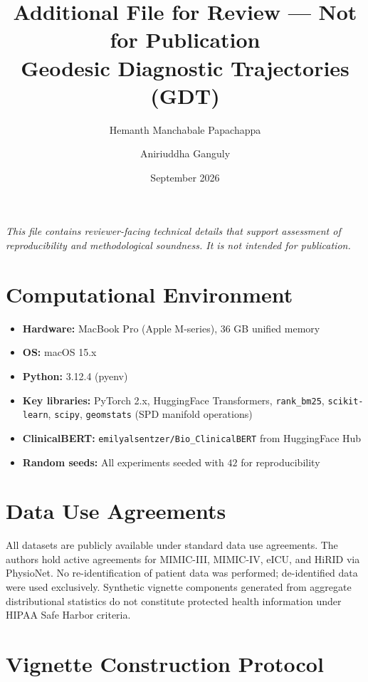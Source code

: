 \documentclass[11pt]{article}
\title{Additional File for Review --- Not for Publication\\
\large Geodesic Diagnostic Trajectories (GDT)}
\author{Hemanth Manchabale Papachappa \and Aniriuddha Ganguly}
\date{September 2026}
\begin{document}
\maketitle

\noindent\textit{This file contains reviewer-facing technical details that
support assessment of reproducibility and methodological soundness. It is not
intended for publication.}

\tableofcontents
\newpage

\section{Computational Environment}

\begin{itemize}
  \item \textbf{Hardware:} MacBook Pro (Apple M-series), 36 GB unified memory
  \item \textbf{OS:} macOS 15.x
  \item \textbf{Python:} 3.12.4 (pyenv)
  \item \textbf{Key libraries:} PyTorch 2.x, HuggingFace Transformers,
        \texttt{rank\_bm25}, \texttt{scikit-learn}, \texttt{scipy},
        \texttt{geomstats} (SPD manifold operations)
  \item \textbf{ClinicalBERT:} \texttt{emilyalsentzer/Bio\_ClinicalBERT} from
        HuggingFace Hub
  \item \textbf{Random seeds:} All experiments seeded with $42$ for
        reproducibility
\end{itemize}

\section{Data Use Agreements}

All datasets are publicly available under standard data use agreements. The
authors hold active agreements for MIMIC-III, MIMIC-IV, eICU, and HiRID via
PhysioNet. No re-identification of patient data was performed; de-identified
data were used exclusively. Synthetic vignette components generated from
aggregate distributional statistics do not constitute protected health information
under HIPAA Safe Harbor criteria.

\section{Vignette Construction Protocol}
\end{document}
